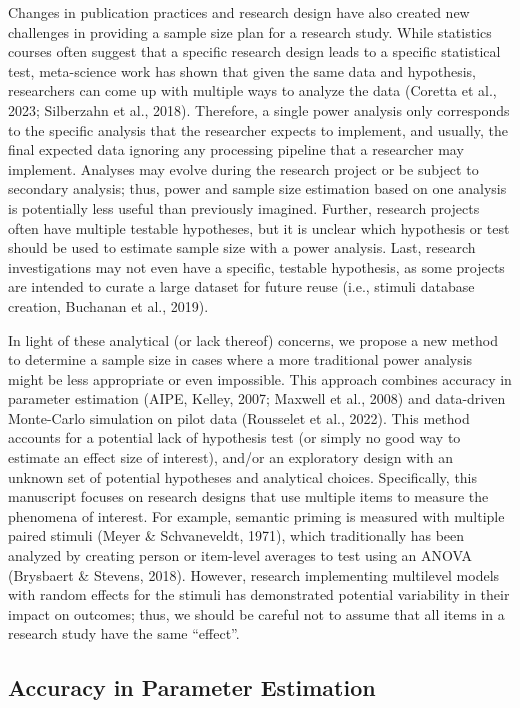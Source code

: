 \documentclass[
  man]{apa7}
\begin{document}
Changes in publication practices and research design have also created new challenges in providing a sample size plan for a research study. While statistics courses often suggest that a specific research design leads to a specific statistical test, meta-science work has shown that given the same data and hypothesis, researchers can come up with multiple ways to analyze the data (Coretta et al., 2023; Silberzahn et al., 2018). Therefore, a single power analysis only corresponds to the specific analysis that the researcher expects to implement, and usually, the final expected data ignoring any processing pipeline that a researcher may implement. Analyses may evolve during the research project or be subject to secondary analysis; thus, power and sample size estimation based on one analysis is potentially less useful than previously imagined. Further, research projects often have multiple testable hypotheses, but it is unclear which hypothesis or test should be used to estimate sample size with a power analysis. Last, research investigations may not even have a specific, testable hypothesis, as some projects are intended to curate a large dataset for future reuse (i.e., stimuli database creation, Buchanan et al., 2019).

In light of these analytical (or lack thereof) concerns, we propose a new method to determine a sample size in cases where a more traditional power analysis might be less appropriate or even impossible. This approach combines accuracy in parameter estimation (AIPE, Kelley, 2007; Maxwell et al., 2008) and data-driven Monte-Carlo simulation on pilot data (Rousselet et al., 2022). This method accounts for a potential lack of hypothesis test (or simply no good way to estimate an effect size of interest), and/or an exploratory design with an unknown set of potential hypotheses and analytical choices. Specifically, this manuscript focuses on research designs that use multiple items to measure the phenomena of interest. For example, semantic priming is measured with multiple paired stimuli (Meyer \& Schvaneveldt, 1971), which traditionally has been analyzed by creating person or item-level averages to test using an ANOVA (Brysbaert \& Stevens, 2018). However, research implementing multilevel models with random effects for the stimuli has demonstrated potential variability in their impact on outcomes; thus, we should be careful not to assume that all items in a research study have the same ``effect''.

\subsection{Accuracy in Parameter Estimation}\label{accuracy-in-parameter-estimation}
\end{document}
